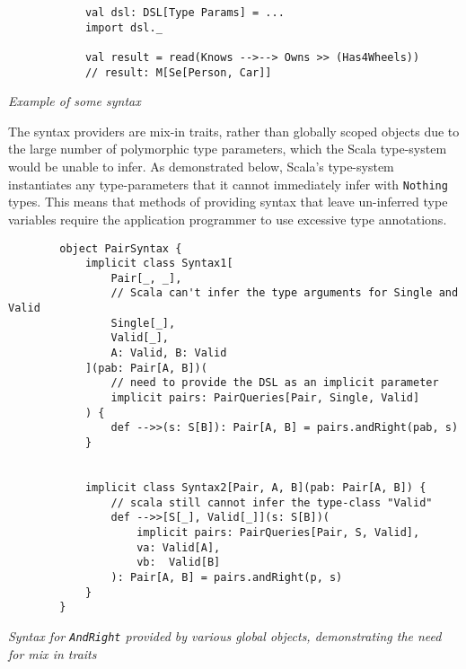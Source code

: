 \documentclass{report}
\newcommand \2[0]{\textbf{2}}
\newcommand \3[0]{\textbf{3}}
\begin{document}
\begin{framed}
    \begin{framed}
        \begin{verbatim}
            val dsl: DSL[Type Params] = ...
            import dsl._
        
            val result = read(Knows -->--> Owns >> (Has4Wheels))
            // result: M[Se[Person, Car]]
        \end{verbatim}       
    \end{framed}
    \textit{Example of some syntax}
\end{framed}



The syntax providers are mix-in traits, rather than globally scoped objects due to the large number of polymorphic type parameters, which the Scala type-system would be unable to infer. As demonstrated below, Scala's type-system instantiates any type-parameters that it cannot immediately infer with \texttt{Nothing} types. This means that methods of providing syntax that leave un-inferred type variables require the application programmer to use excessive type annotations.
\begin{framed}
\begin{framed}
    \begin{verbatim}
        object PairSyntax {
            implicit class Syntax1[
                Pair[_, _], 
                // Scala can't infer the type arguments for Single and Valid
                Single[_], 
                Valid[_], 
                A: Valid, B: Valid
            ](pab: Pair[A, B])(
                // need to provide the DSL as an implicit parameter
                implicit pairs: PairQueries[Pair, Single, Valid]
            ) {
                def -->>(s: S[B]): Pair[A, B] = pairs.andRight(pab, s)
            }
            
            
            implicit class Syntax2[Pair, A, B](pab: Pair[A, B]) {
                // scala still cannot infer the type-class "Valid"
                def -->>[S[_], Valid[_]](s: S[B])(
                    implicit pairs: PairQueries[Pair, S, Valid],
                    va: Valid[A],
                    vb:  Valid[B]
                ): Pair[A, B] = pairs.andRight(p, s)
            }
        }
        \end{verbatim}
\end{framed}
\textit{Syntax for \texttt{AndRight}  provided by various global objects, demonstrating the need for mix in traits}
\end{framed}
\end{document}
